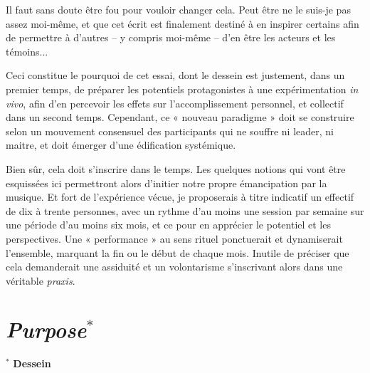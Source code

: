 \documentclass{article}
\begin{document}
Il faut sans doute être fou pour vouloir changer cela. Peut être ne le suis-je pas assez moi-même, et que cet écrit est finalement destiné à en inspirer certains afin de permettre à d'autres -- y compris moi-même -- d'en être les acteurs et les témoins...

\bigskip
Ceci constitue le pourquoi de cet essai, dont le dessein est justement, dans un premier temps, de préparer les potentiels protagonistes à une expérimentation \textit{in vivo}, afin d'en percevoir les effets sur l'accomplissement personnel, et collectif dans un second temps. Cependant, ce « nouveau paradigme » doit se construire selon un mouvement consensuel des participants qui ne souffre ni leader, ni  maitre, et doit émerger d'une édification systémique. 

Bien sûr, cela doit s'inscrire dans le temps. Les quelques notions qui vont être esquissées ici permettront alors d'initier notre propre émancipation par la musique. 
Et fort de l'expérience vécue, je proposerais à titre indicatif un effectif de dix à trente personnes, avec un rythme d'au moins une session par semaine sur une période d'au moins six mois, et ce pour en apprécier le potentiel et les perspectives. 
Une « performance » au sens rituel ponctuerait et dynamiserait l'ensemble, marquant la fin ou le début de chaque mois. Inutile de préciser que cela demanderait une assiduité et un volontarisme s'inscrivant alors dans une véritable \textit{praxis}. 

\section*{\textsl{Purpose}$^\ast$}
$^\ast$ \textbf{Dessein}
\label{purpose}
\end{document}
